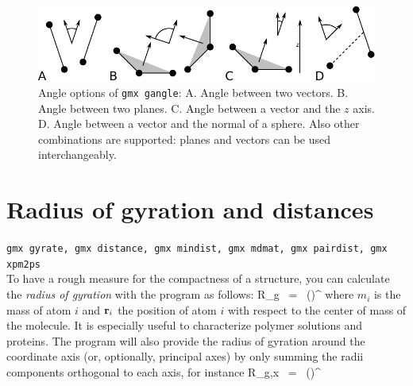 \begin{figure}
\centerline{
{\includegraphics{plots/sgangle}}}
\caption[Angle options of {\tt gmx gangle}.]{Angle options of {\tt gmx gangle}:
A. Angle between two vectors.
B. Angle between two planes.
C. Angle between a vector and the $z$ axis.
D. Angle between a vector and the normal of a sphere.
Also other combinations are supported: planes and vectors can be used
interchangeably.}
\label{fig:sgangle}
\end{figure}


\section{Radius of gyration and distances}
\label{sec:rg}
{\tt gmx gyrate, gmx distance, gmx mindist, gmx mdmat, gmx pairdist, gmx xpm2ps}\\
To have a rough measure for the compactness of a structure, you can calculate 
the {\em radius of gyration} with the program {\tt {}} as follows:
\beq
R_g ~=~ \left({}\right)^{\half}
\label{eqn:rg}
\eeq
where $m_i$ is the mass of atom $i$ and ${\bf r}_i$ the position of 
atom $i$ with respect to the center of mass of the molecule. It is especially 
useful to characterize polymer solutions and proteins. The program will also
provide the radius of gyration around the coordinate axis (or, optionally, principal axes)
by only summing the radii components orthogonal to each axis, for instance
\beq
R_{g,x} ~=~ \left({}\right)^{\half}
\label{eqn:rgaxis}
\eeq

